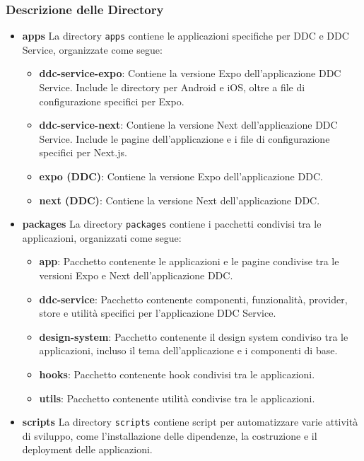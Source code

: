 \subsubsection{Descrizione delle Directory}
\begin{itemize}
    \item \textbf{apps}
    La directory \texttt{apps} contiene le applicazioni specifiche per DDC e DDC Service, organizzate come segue:
    \begin{itemize}
        \item \textbf{ddc-service-expo}: Contiene la versione Expo dell'applicazione DDC Service. Include le directory per Android e iOS, oltre a file di configurazione specifici per Expo.
        \item \textbf{ddc-service-next}: Contiene la versione Next dell'applicazione DDC Service. Include le pagine dell'applicazione e i file di configurazione specifici per Next.js.
        \item \textbf{expo (DDC)}: Contiene la versione Expo dell'applicazione DDC.
        \item \textbf{next (DDC)}: Contiene la versione Next dell'applicazione DDC.
    \end{itemize}

    \item \textbf{packages}
    La directory \texttt{packages} contiene i pacchetti condivisi tra le applicazioni, organizzati come segue:
    \begin{itemize}
        \item \textbf{app}: Pacchetto contenente le applicazioni e le pagine condivise tra le versioni Expo e Next dell'applicazione DDC.
        \item \textbf{ddc-service}: Pacchetto contenente componenti, funzionalità, provider, store e utilità specifici per l'applicazione DDC Service.
        \item \textbf{design-system}: Pacchetto contenente il design system condiviso tra le applicazioni, incluso il tema dell'applicazione e i componenti di base.
        \item \textbf{hooks}: Pacchetto contenente hook condivisi tra le applicazioni.
        \item \textbf{utils}: Pacchetto contenente utilità condivise tra le applicazioni.
    \end{itemize}

    \item \textbf{scripts}
    La directory \texttt{scripts} contiene script per automatizzare varie attività di sviluppo, come l'installazione delle dipendenze, la costruzione e il deployment delle applicazioni.


\end{itemize}
